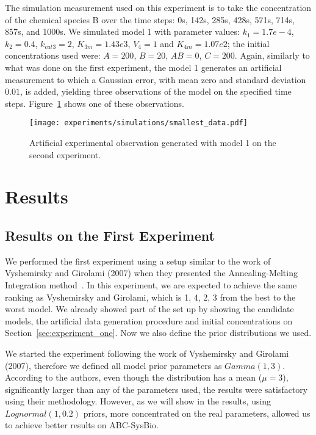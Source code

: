 The simulation measurement used on this experiment is to take the 
concentration of the chemical species B over the time steps: 0s, 142s,
285s, 428s, 571s, 714s, 857s, and 1000s. We simulated model 1 with 
parameter values: $k_1 = 1.7e-4$, $k_2 = 0.4$, $k_{cat3} = 2$, 
$K_{3m} = 1.43e3$, $V_4 = 1$ and $K_{4m} = 1.07e2$; the initial 
concentrations used were: $A = 200$, $B = 20$, $AB = 0$, $C = 200$.
Again, similarly to what was done on the first experiment, the model 1
generates an artificial measurement to which a Gaussian error, with 
mean zero and standard deviation $0.01$, is added, yielding three 
observations of the model on the specified time steps. 
Figure~\ref{fig:sma_simulation} shows one of these observations.


\begin{figure}
    \begin{center}
    \texttt{[image: experiments/simulations/smallest\_data.pdf]}
    \caption{Artificial experimental observation generated with model 1 
        on the second experiment.}
    \label{fig:sma_simulation}
    \end{center}
\end{figure}


\section{Results}

\subsection{Results on the First Experiment}
We performed the first experiment using a setup similar to the work of
Vyshemirsky and Girolami (2007) when they presented the 
Annealing-Melting Integration method~\cite{Vyshemirsky2007}. 
In this experiment, we are expected to achieve the same ranking as 
Vyshemirsky and Girolami, which is 1, 4, 2, 3 from the best to the worst 
model. We already showed part of the set up by showing the candidate 
models, the artificial data generation procedure and initial 
concentrations on Section~\ref{sec:experiment_one}. Now we also define 
the prior distributions we used. 

We started the experiment following the work of Vyshemirsky and Girolami
(2007), therefore we defined all model prior parameters as 
$Gamma (1, 3)$. According to the authors, even though the distribution 
has a mean ($\mu = 3$), significantly larger than any of the parameters
used, the results were satisfactory using their methodology. However,
as we will show in the results, using $Lognormal (1, 0.2)$ priors, more 
concentrated on the real parameters, allowed us to achieve better 
results on ABC-SysBio. 


